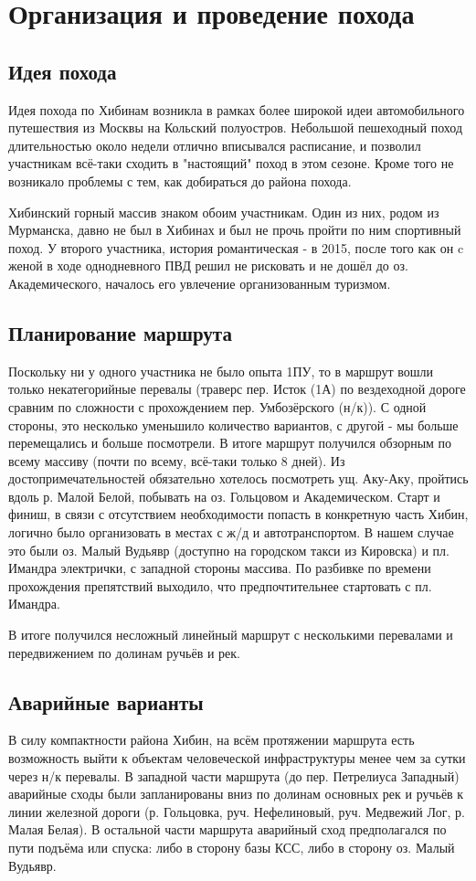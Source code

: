 \section{Организация и проведение похода}
\subsection{Идея похода}
Идея похода по Хибинам возникла в рамках более широкой идеи автомобильного путешествия из Москвы на Кольский полуостров.
Небольшой пешеходный поход длительностью около недели отлично вписывался расписание, и позволил участникам
всё-таки сходить в "настоящий" поход в этом сезоне. Кроме того не возникало проблемы с тем, как добираться до района похода.

Хибинский горный массив знаком обоим участникам. Один из них, родом из Мурманска, давно не был в Хибинах и был не прочь
пройти по ним спортивный поход. У второго участника, история романтическая - в 2015, после того как он c женой
в ходе однодневного ПВД решил не рисковать и не дошёл до оз. Академического, началось его увлечение организованным туризмом.

\subsection{Планирование маршрута}
Поскольку ни у одного участника не было опыта 1ПУ, то в маршрут вошли только некатегорийные перевалы
(траверс пер. Исток (1А) по вездеходной дороге сравним по сложности с прохождением пер. Умбозёрского (н/к)).
С одной стороны, это несколько уменьшило количество вариантов, с другой - мы больше перемещались и больше посмотрели.
В итоге маршрут получился обзорным по всему массиву (почти по всему, всё-таки только 8 дней).
Из достопримечательностей обязательно хотелось посмотреть ущ. Аку-Аку, пройтись вдоль р. Малой Белой,
побывать на оз. Гольцовом и Академическом. Старт и финиш, в связи с отсутствием необходимости попасть в
конкретную часть Хибин, логично было организовать в местах с ж/д и автотранспортом.
В нашем случае это были оз. Малый Вудьявр (доступно на городском такси из Кировска) и пл. Имандра электрички,
с западной стороны массива. По разбивке по времени прохождения препятствий выходило, что предпочтительнее стартовать
с пл. Имандра.

В итоге получился несложный линейный маршрут с несколькими перевалами и передвижением по долинам ручьёв и рек.

\subsection{Аварийные варианты}
В силу компактности района Хибин, на всём протяжении маршрута есть возможность выйти к объектам
человеческой инфраструктуры менее чем за сутки через н/к перевалы. В западной части маршрута
(до пер. Петрелиуса Западный) аварийные сходы были запланированы вниз по долинам основных рек и ручьёв к линии
железной дороги (р. Гольцовка, руч. Нефелиновый, руч. Медвежий Лог, р. Малая Белая). В остальной части маршрута
аварийный сход предполагался по пути подъёма или спуска: либо в сторону базы КСС, либо в сторону оз. Малый Вудьявр.

